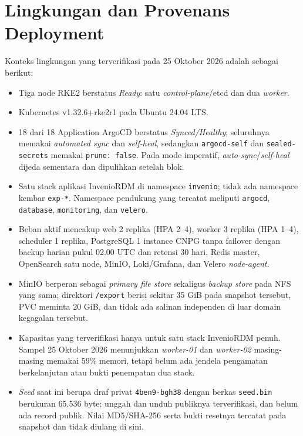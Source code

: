 \section{Lingkungan dan Provenans Deployment}

Konteks lingkungan yang terverifikasi pada 25 Oktober 2026 adalah sebagai berikut:
\begin{itemize}
  \item Tiga node RKE2 berstatus \textit{Ready}: satu \textit{control-plane}/etcd dan dua \textit{worker}.
  \item Kubernetes v1.32.6+rke2r1 pada Ubuntu 24.04 LTS.
  \item 18 dari 18 Application ArgoCD berstatus \textit{Synced/Healthy}; seluruhnya memakai \textit{automated sync} dan \textit{self-heal}, sedangkan \texttt{argocd-self} dan \texttt{sealed-secrets} memakai \texttt{prune: false}. Pada mode imperatif, \textit{auto-sync}/\textit{self-heal} dijeda sementara dan dipulihkan setelah blok.
  \item Satu stack aplikasi InvenioRDM di namespace \texttt{invenio}; tidak ada namespace kembar \texttt{exp-*}. Namespace pendukung yang tercatat meliputi \texttt{argocd}, \texttt{database}, \texttt{monitoring}, dan \texttt{velero}.
  \item Beban aktif mencakup web 2 replika (HPA 2--4), worker 3 replika (HPA 1--4), scheduler 1 replika, PostgreSQL 1 instance CNPG tanpa failover dengan backup harian pukul 02.00 UTC dan retensi 30 hari, Redis master, OpenSearch satu node, MinIO, Loki/Grafana, dan Velero \textit{node-agent}.
  \item MinIO berperan sebagai \textit{primary file store} sekaligus \textit{backup store} pada NFS yang sama; direktori \texttt{/export} berisi sekitar 35 GiB pada snapshot tersebut, PVC meminta 20 GiB, dan tidak ada salinan independen di luar domain kegagalan tersebut.
  \item Kapasitas yang terverifikasi hanya untuk satu stack InvenioRDM penuh. Sampel 25 Oktober 2026 menunjukkan \textit{worker-01} dan \textit{worker-02} masing-masing memakai 59\% memori, tetapi belum ada jendela pengamatan berkelanjutan atau bukti penempatan dua stack.
  \item \textit{Seed} saat ini berupa draf privat \texttt{4ben9-bgh38} dengan berkas \texttt{seed.bin} berukuran 65.536 byte; unggah dan unduh publiknya terverifikasi, dan belum ada record publik. Nilai MD5/SHA-256 serta bukti resetnya tercatat pada snapshot dan tidak diulang di sini.
\end{itemize}

